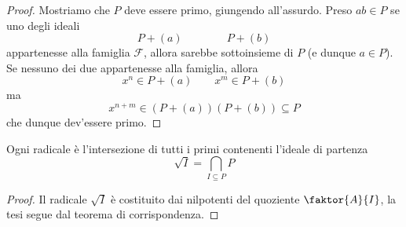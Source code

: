 \begin{multicols}{2}
\begin{proof}
	Mostriamo che $ P $ deve essere primo, giungendo all'assurdo. Preso $ ab \in P $ se uno degli ideali 
	\[ P + (a) \qquad \qquad P + (b) \]
	appartenesse alla famiglia $ \mathcal{F} $, allora sarebbe sottoinsieme di $ P $ (e dunque $ a \in P $). Se nessuno dei due appartenesse alla famiglia, allora
	\[ x^n \in P + (a) \qquad x^m \in P + (b) \]
	ma
	\[ x^{n + m} \in (P + (a))(P + (b)) \subseteq P \]
	che dunque dev'essere primo.
\end{proof}
\begin{theorem}
	Ogni radicale è l'intersezione di tutti i primi contenenti l'ideale di partenza
	$$  \sqrt{I} = \bigcap_{I \subseteq P} P  $$
\end{theorem}
\begin{proof}
	Il radicale $ \sqrt{I} $ è costituito dai nilpotenti del quoziente $ \faktor{A}{I} $, la tesi segue dal teorema di corrispondenza.
\end{proof}

\end{multicols}

